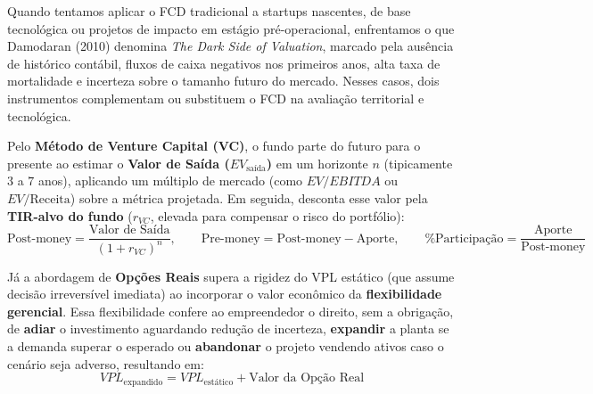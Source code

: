 Quando tentamos aplicar o FCD tradicional a startups nascentes, de base tecnológica ou projetos de impacto em estágio pré-operacional, enfrentamos o que Damodaran (2010) denomina \textit{The Dark Side of Valuation}, marcado pela ausência de histórico contábil, fluxos de caixa negativos nos primeiros anos, alta taxa de mortalidade e incerteza sobre o tamanho futuro do mercado. Nesses casos, dois instrumentos complementam ou substituem o FCD na avaliação territorial e tecnológica.

\begin{boxConceito}
Pelo \textbf{Método de Venture Capital (VC)}, o fundo parte do futuro para o presente ao estimar o \textbf{Valor de Saída ($EV_{\text{saída}}$)} em um horizonte $n$ (tipicamente $3$ a $7$ anos), aplicando um múltiplo de mercado (como $EV/EBITDA$ ou $EV/\text{Receita}$) sobre a métrica projetada. Em seguida, desconta esse valor pela \textbf{TIR-alvo do fundo} ($r_{VC}$, elevada para compensar o risco do portfólio):
\[
  \text{Post-money} = \frac{\text{Valor de Saída}}{(1 + r_{VC})^n}, \qquad \text{Pre-money} = \text{Post-money} - \text{Aporte}, \qquad \%\text{Participação} = \frac{\text{Aporte}}{\text{Post-money}}
\]

Já a abordagem de \textbf{Opções Reais} supera a rigidez do VPL estático (que assume decisão irreversível imediata) ao incorporar o valor econômico da \textbf{flexibilidade gerencial}. Essa flexibilidade confere ao empreendedor o direito, sem a obrigação, de \textbf{adiar} o investimento aguardando redução de incerteza, \textbf{expandir} a planta se a demanda superar o esperado ou \textbf{abandonar} o projeto vendendo ativos caso o cenário seja adverso, resultando em:
\[
  VPL_{\text{expandido}} = VPL_{\text{estático}} + \text{Valor da Opção Real}
\]
\end{boxConceito}


